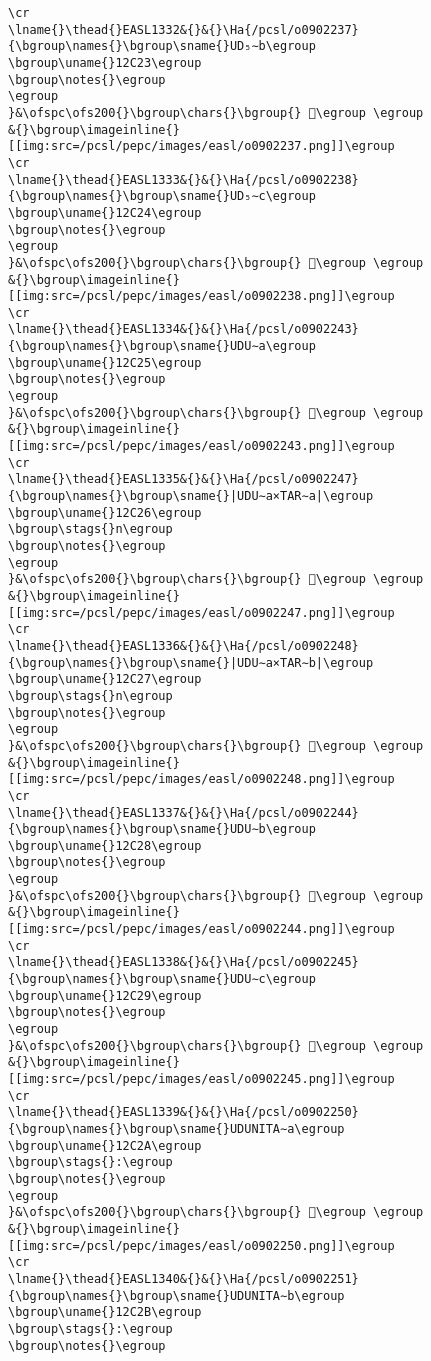 \begin{verbatim}
\cr
\lname{}\thead{}EASL1332&{}&{}\Ha{/pcsl/o0902237}{\bgroup\names{}\bgroup\sname{}UD₅∼b\egroup
\bgroup\uname{}12C23\egroup
\bgroup\notes{}\egroup
\egroup
}&\ofspc\ofs200{}\bgroup\chars{}\bgroup{} 𒰣\egroup \egroup
&{}\bgroup\imageinline{}[[img:src=/pcsl/pepc/images/easl/o0902237.png]]\egroup
\cr
\lname{}\thead{}EASL1333&{}&{}\Ha{/pcsl/o0902238}{\bgroup\names{}\bgroup\sname{}UD₅∼c\egroup
\bgroup\uname{}12C24\egroup
\bgroup\notes{}\egroup
\egroup
}&\ofspc\ofs200{}\bgroup\chars{}\bgroup{} 𒰤\egroup \egroup
&{}\bgroup\imageinline{}[[img:src=/pcsl/pepc/images/easl/o0902238.png]]\egroup
\cr
\lname{}\thead{}EASL1334&{}&{}\Ha{/pcsl/o0902243}{\bgroup\names{}\bgroup\sname{}UDU∼a\egroup
\bgroup\uname{}12C25\egroup
\bgroup\notes{}\egroup
\egroup
}&\ofspc\ofs200{}\bgroup\chars{}\bgroup{} 𒰥\egroup \egroup
&{}\bgroup\imageinline{}[[img:src=/pcsl/pepc/images/easl/o0902243.png]]\egroup
\cr
\lname{}\thead{}EASL1335&{}&{}\Ha{/pcsl/o0902247}{\bgroup\names{}\bgroup\sname{}|UDU∼a×TAR∼a|\egroup
\bgroup\uname{}12C26\egroup
\bgroup\stags{}n\egroup
\bgroup\notes{}\egroup
\egroup
}&\ofspc\ofs200{}\bgroup\chars{}\bgroup{} 𒰦\egroup \egroup
&{}\bgroup\imageinline{}[[img:src=/pcsl/pepc/images/easl/o0902247.png]]\egroup
\cr
\lname{}\thead{}EASL1336&{}&{}\Ha{/pcsl/o0902248}{\bgroup\names{}\bgroup\sname{}|UDU∼a×TAR∼b|\egroup
\bgroup\uname{}12C27\egroup
\bgroup\stags{}n\egroup
\bgroup\notes{}\egroup
\egroup
}&\ofspc\ofs200{}\bgroup\chars{}\bgroup{} 𒰧\egroup \egroup
&{}\bgroup\imageinline{}[[img:src=/pcsl/pepc/images/easl/o0902248.png]]\egroup
\cr
\lname{}\thead{}EASL1337&{}&{}\Ha{/pcsl/o0902244}{\bgroup\names{}\bgroup\sname{}UDU∼b\egroup
\bgroup\uname{}12C28\egroup
\bgroup\notes{}\egroup
\egroup
}&\ofspc\ofs200{}\bgroup\chars{}\bgroup{} 𒰨\egroup \egroup
&{}\bgroup\imageinline{}[[img:src=/pcsl/pepc/images/easl/o0902244.png]]\egroup
\cr
\lname{}\thead{}EASL1338&{}&{}\Ha{/pcsl/o0902245}{\bgroup\names{}\bgroup\sname{}UDU∼c\egroup
\bgroup\uname{}12C29\egroup
\bgroup\notes{}\egroup
\egroup
}&\ofspc\ofs200{}\bgroup\chars{}\bgroup{} 𒰩\egroup \egroup
&{}\bgroup\imageinline{}[[img:src=/pcsl/pepc/images/easl/o0902245.png]]\egroup
\cr
\lname{}\thead{}EASL1339&{}&{}\Ha{/pcsl/o0902250}{\bgroup\names{}\bgroup\sname{}UDUNITA∼a\egroup
\bgroup\uname{}12C2A\egroup
\bgroup\stags{}:\egroup
\bgroup\notes{}\egroup
\egroup
}&\ofspc\ofs200{}\bgroup\chars{}\bgroup{} 𒰪\egroup \egroup
&{}\bgroup\imageinline{}[[img:src=/pcsl/pepc/images/easl/o0902250.png]]\egroup
\cr
\lname{}\thead{}EASL1340&{}&{}\Ha{/pcsl/o0902251}{\bgroup\names{}\bgroup\sname{}UDUNITA∼b\egroup
\bgroup\uname{}12C2B\egroup
\bgroup\stags{}:\egroup
\bgroup\notes{}\egroup

\end{verbatim}
